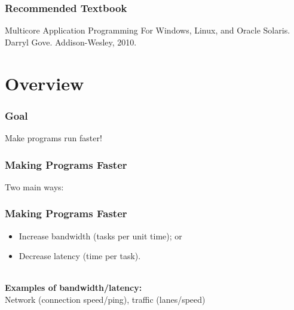 \begin{frame}
  \frametitle{Recommended Textbook}


  Multicore Application Programming For Windows, Linux, and Oracle Solaris.
  Darryl Gove. Addison-Wesley, 2010.
\end{frame}

\section{Overview}
\begin{frame}
  \frametitle{Goal}

\hspace*{3em} \Large Make programs run faster!
\end{frame}

\begin{frame}
  \frametitle{Making Programs Faster}

  \begin{changemargin}{2cm}
  Two main ways:\\[1em]
  \end{changemargin}
  \begin{center}
  \end{center}
\end{frame}
  

\begin{frame}
  \frametitle{Making Programs Faster}
  \begin{changemargin}{2cm}
  \begin{itemize}
    \item Increase bandwidth (tasks per unit time); or
    \item Decrease latency (time per task).
  \end{itemize}~\\[1em]
 {\bf Examples of bandwidth/latency:}\\Network (connection speed/ping),
          traffic (lanes/speed)
  \end{changemargin}

\end{frame}

